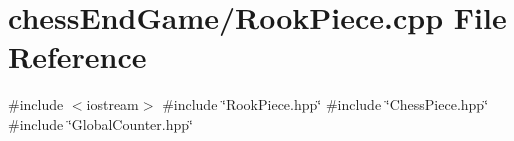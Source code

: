\section{chess\+End\+Game/\+Rook\+Piece.cpp File Reference}
\label{_rook_piece_8cpp}
{\ttfamily \#include $<$iostream$>$}\newline
{\ttfamily \#include \char`\"{}Rook\+Piece.\+hpp\char`\"{}}\newline
{\ttfamily \#include \char`\"{}Chess\+Piece.\+hpp\char`\"{}}\newline
{\ttfamily \#include \char`\"{}Global\+Counter.\+hpp\char`\"{}}\newline

